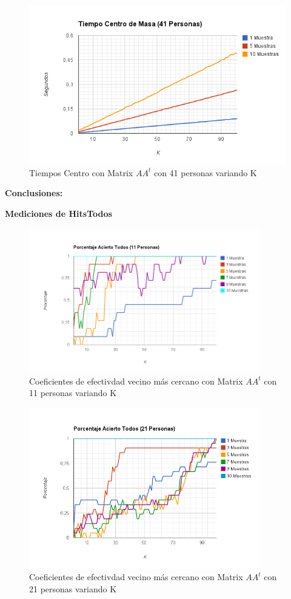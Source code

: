 \begin{figure}[H]
\includegraphics[width=1\textwidth]{img/imagei.png}
     \caption{Tiempos Centro con Matrix $AA^t$ con 41 personas variando K}
\end{figure}

\textbf{Conclusiones:}

\textbf{Mediciones de HitsTodos}

\begin{figure}[H]
\includegraphics[width=0.9\textwidth]{img/imagej.png}
     \caption{Coeficientes de efectivdad vecino más cercano con Matrix $AA^t$ con 11 personas variando K}
\end{figure}

\begin{figure}[H]
\includegraphics[width=0.9\textwidth]{img/imagek.png}
     \caption{Coeficientes de efectivdad vecino más cercano con Matrix $AA^t$ con 21 personas variando K}
\end{figure}

